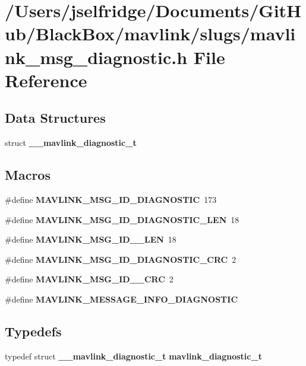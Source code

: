 \section{/\+Users/jselfridge/\+Documents/\+Git\+Hub/\+Black\+Box/mavlink/slugs/mavlink\+\_\+msg\+\_\+diagnostic.h File Reference}
\label{mavlink__msg__diagnostic_8h}
\subsection*{Data Structures}
\begin{DoxyCompactItemize}
\item 
struct \textbf{ \+\_\+\+\_\+mavlink\+\_\+diagnostic\+\_\+t}
\end{DoxyCompactItemize}
\subsection*{Macros}
\begin{DoxyCompactItemize}
\item 
\#define \textbf{ M\+A\+V\+L\+I\+N\+K\+\_\+\+M\+S\+G\+\_\+\+I\+D\+\_\+\+D\+I\+A\+G\+N\+O\+S\+T\+IC}~173
\item 
\#define \textbf{ M\+A\+V\+L\+I\+N\+K\+\_\+\+M\+S\+G\+\_\+\+I\+D\+\_\+\+D\+I\+A\+G\+N\+O\+S\+T\+I\+C\+\_\+\+L\+EN}~18
\item 
\#define \textbf{ M\+A\+V\+L\+I\+N\+K\+\_\+\+M\+S\+G\+\_\+\+I\+D\+\_\+\_\+\+L\+EN}~18
\item 
\#define \textbf{ M\+A\+V\+L\+I\+N\+K\+\_\+\+M\+S\+G\+\_\+\+I\+D\+\_\+\+D\+I\+A\+G\+N\+O\+S\+T\+I\+C\+\_\+\+C\+RC}~2
\item 
\#define \textbf{ M\+A\+V\+L\+I\+N\+K\+\_\+\+M\+S\+G\+\_\+\+I\+D\+\_\+\_\+\+C\+RC}~2
\item 
\#define \textbf{ M\+A\+V\+L\+I\+N\+K\+\_\+\+M\+E\+S\+S\+A\+G\+E\+\_\+\+I\+N\+F\+O\+\_\+\+D\+I\+A\+G\+N\+O\+S\+T\+IC}
\end{DoxyCompactItemize}
\subsection*{Typedefs}
\begin{DoxyCompactItemize}
\item 
typedef struct \textbf{ \+\_\+\+\_\+mavlink\+\_\+diagnostic\+\_\+t} \textbf{ mavlink\+\_\+diagnostic\+\_\+t}
\end{DoxyCompactItemize}


